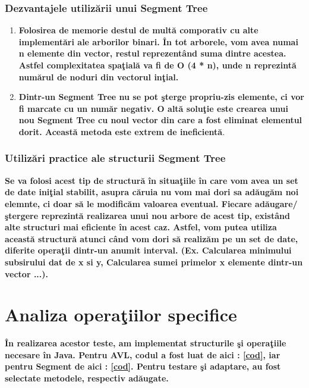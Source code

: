 \documentclass[12pt]{article}
\begin{document}
\subsubsection{Dezvantajele utiliz\u{a}rii unui Segment Tree}

\begin{enumerate}

\item{\textbf{Folosirea de memorie destul de mult\u{a} comporativ cu alte implement\u{a}ri ale arborilor binari. \^{I}n tot arborele, vom avea numai n elemente din vector, restul reprezent\^{a}nd suma dintre acestea. Astfel complexitatea spa\c{t}ial\u{a} va fi de O (4 * n), unde n reprezint\u{a} num\u{a}rul de noduri din vectorul in\c{t}ial. }}

\item{\textbf{Dintr-un Segment Tree nu se pot \c{s}terge propriu-zis elemente, ci vor fi marcate cu un num\u{a}r negativ. O alt\u{a} solu\c{t}ie este crearea unui nou Segment Tree cu noul vector din care a fost eliminat elementul dorit. Aceast\u{a} metoda este extrem de ineficient\u{a}}.}


\end{enumerate}
	

\subsubsection{Utiliz\u{a}ri practice ale structurii Segment Tree}
\textbf{\hspace{7mm} Se va folosi acest tip de structur\u{a} \^{i}n situa\c{t}iile \^{i}n care vom avea un set de date ini\c{t}ial stabilit, asupra c\u{a}ruia nu vom mai dori sa ad\u{a}ug\u{a}m noi elemnte, ci doar s\u{a} le modific\u{a}m valoarea eventual. Fiecare ad\u{a}ugare/\c{s}tergere reprezint\u{a} realizarea unui nou arbore de acest tip, exist\^{a}nd alte structuri mai eficiente \^{i}n acest caz. Astfel, vom putea utiliza aceast\u{a} structur\u{a} atunci c\^{a}nd vom dori s\u{a} realiz\u{a}m pe un set de date, diferite opera\c{t}ii dintr-un anumit interval. (Ex. Calcularea minimului subsirului dat de x si y, Calcularea sumei primelor x elemente dintr-un vector ...). }
\newpage
\section{Analiza opera\c{t}iilor specifice}
\textbf{\hspace{7mm} \^{I}n realizarea acestor teste, am implementat structurile \c{s}i opera\c{t}iile necesare \^{i}n Java. Pentru AVL, codul a fost luat de aici : \href{http://www.geeksforgeeks.org/avl-tree-set-2-deletion/}{[cod]}, iar pentru Segment de aici : \href{https://algs4.cs.princeton.edu/99misc/SegmentTree.java.html}{[cod]}. Pentru testare \c{s}i adaptare, au fost selectate metodele, respectiv ad\u{a}ugate.}
\end{document}
